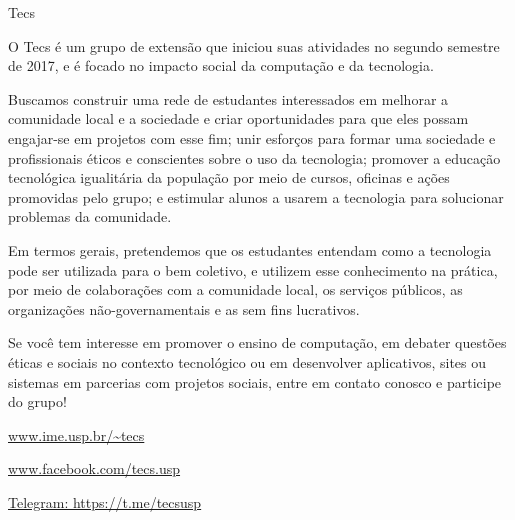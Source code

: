 
\begin{subsecao}{Tecs}


O Tecs é um grupo de extensão que iniciou suas atividades no segundo semestre de
2017, e é focado no impacto social da computação e da tecnologia. 

Buscamos construir uma rede de estudantes interessados em melhorar a comunidade
local e a sociedade e criar oportunidades para que eles possam engajar-se em
projetos com esse fim; unir esforços para formar uma sociedade e profissionais
éticos e conscientes sobre o uso da tecnologia; promover a educação tecnológica
igualitária da população por meio de cursos, oficinas e ações promovidas pelo
grupo; e estimular alunos a usarem a tecnologia para solucionar problemas da
comunidade. 

Em termos gerais, pretendemos que os estudantes entendam como a tecnologia pode
ser utilizada para o bem coletivo, e utilizem esse conhecimento na prática, por
meio de colaborações com a comunidade local, os serviços públicos, as
organizações não-governamentais e as sem fins lucrativos. 

Se você tem interesse em promover o ensino de computação, em debater questões
éticas e sociais no contexto tecnológico ou em desenvolver aplicativos, sites ou
sistemas em parcerias com projetos sociais, entre em contato conosco e participe
do grupo!

\begin{center}
  \Large
  \url{www.ime.usp.br/~tecs}

  \url{www.facebook.com/tecs.usp}

  \url{Telegram: https://t.me/tecsusp}
\end{center}

\end{subsecao}
